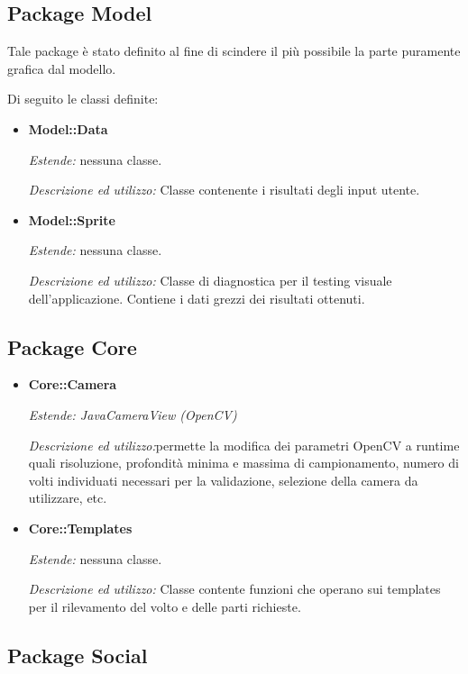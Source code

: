 \subsection{Package Model}

Tale package è stato definito al fine di scindere il più possibile la parte puramente grafica dal modello.

Di seguito le classi definite:
\begin{itemize}

\item \textbf{Model::Data}

\textit{Estende:} nessuna classe.

\textit{Descrizione ed utilizzo:} Classe contenente i risultati degli input utente.

\item \textbf{Model::Sprite}

\textit{Estende:} nessuna classe.

\textit{Descrizione ed utilizzo:} Classe di diagnostica per il testing visuale dell'applicazione. Contiene i dati grezzi dei risultati ottenuti.

\end{itemize}
\subsection{Package Core}

\begin{itemize}
\item \textbf{Core::Camera}

\textit{Estende: JavaCameraView (OpenCV)}

\textit{Descrizione ed utilizzo:}permette la modifica dei parametri OpenCV a runtime quali risoluzione, profondità minima e massima di campionamento, numero di volti individuati necessari per la validazione, selezione della camera da utilizzare, etc.

\item \textbf{Core::Templates}

\textit{Estende:} nessuna classe. 

\textit{Descrizione ed utilizzo:} Classe contente funzioni che operano sui templates per il rilevamento del volto e delle parti richieste.
\end{itemize}
\subsection{Package Social}

